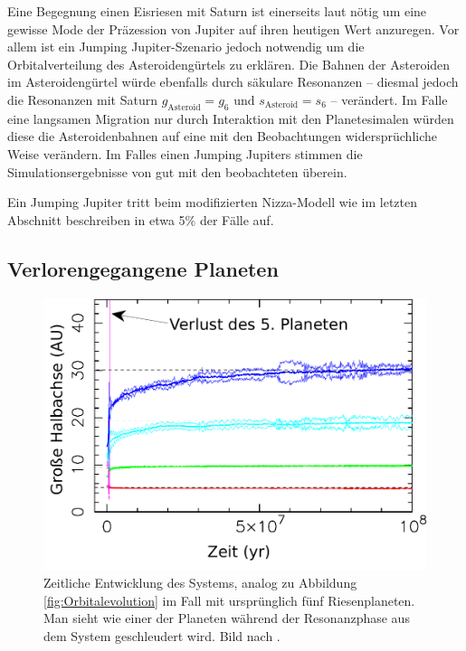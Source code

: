 \documentclass[12pt,a4paper,twoside]{article}
\begin{document}
Eine Begegnung einen Eisriesen mit Saturn ist einerseits laut \cite{Morbidelli2009} nötig um eine gewisse Mode der Präzession von Jupiter auf ihren heutigen Wert anzuregen. %
Vor allem ist ein Jumping Jupiter-Szenario jedoch notwendig um die Orbitalverteilung des Asteroidengürtels zu erklären\cite{Morbidelli2010}. Die Bahnen der Asteroiden im Asteroidengürtel würde ebenfalls durch säkulare Resonanzen -- diesmal jedoch die Resonanzen mit Saturn $g_\mathrm{Asteroid}=g_6$ und $s_\mathrm{Asteroid}=s_6$ -- verändert. Im Falle eine langsamen Migration nur durch Interaktion mit den Planetesimalen würden diese die Asteroidenbahnen auf eine mit den Beobachtungen widersprüchliche Weise verändern. Im Falles einen Jumping Jupiters stimmen die Simulationsergebnisse von \cite{Morbidelli2010} gut mit den beobachteten überein.

Ein Jumping Jupiter tritt beim modifizierten Nizza-Modell wie im letzten Abschnitt beschreiben in etwa 5\% der Fälle auf\cite{Brasser2009}.

\subsection{Verlorengegangene Planeten}
\begin{figure}[tbhn]
\centering
\includegraphics[scale=0.5]{img/Nesvorny2011-1.pdf}
\caption{Zeitliche Entwicklung des Systems, analog zu Abbildung \ref{fig:Orbitalevolution} im Fall mit ursprünglich fünf Riesenplaneten. Man sieht wie einer der Planeten während der Resonanzphase aus dem System geschleudert wird. Bild nach \cite{Nesvorny2011}. }
\label{fig:5planeten}
\end{figure}
\end{document}
